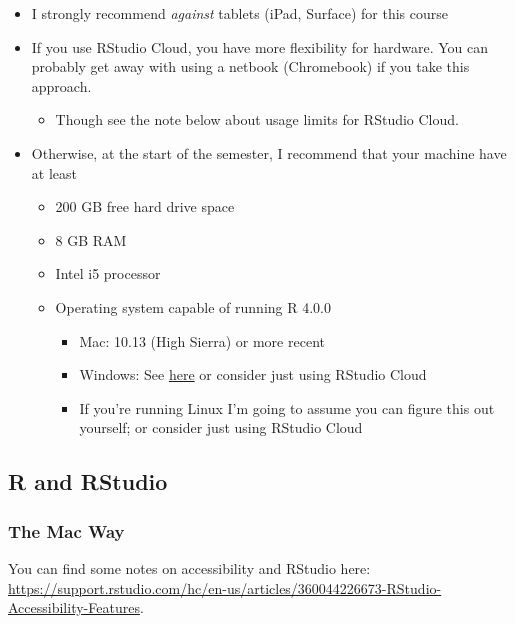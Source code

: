 \documentclass[
]{article}
\providecommand{\tightlist}{%
  \setlength{\itemsep}{0pt}\setlength{\parskip}{0pt}}
\begin{document}
\begin{itemize}
\tightlist
\item
  I strongly recommend \emph{against} tablets (iPad, Surface) for this course
\item
  If you use RStudio Cloud, you have more flexibility for hardware. You can probably get away with using a netbook (Chromebook) if you take this approach.

  \begin{itemize}
  \tightlist
  \item
    Though see the note below about usage limits for RStudio Cloud.
  \end{itemize}
\item
  Otherwise, at the start of the semester, I recommend that your machine have at least

  \begin{itemize}
  \tightlist
  \item
    200 GB free hard drive space
  \item
    8 GB RAM
  \item
    Intel i5 processor
  \item
    Operating system capable of running R 4.0.0

    \begin{itemize}
    \tightlist
    \item
      Mac: 10.13 (High Sierra) or more recent
    \item
      Windows: See \href{https://cran.r-project.org/bin/windows/base/rw-FAQ.html\#Does-R-run-under-Windows-Vista_003f}{here} or consider just using RStudio Cloud
    \item
      If you're running Linux I'm going to assume you can figure this out yourself; or consider just using RStudio Cloud
    \end{itemize}
  \end{itemize}
\end{itemize}

\hypertarget{r-and-rstudio}{%
\subsection{R and RStudio}\label{r-and-rstudio}}

\hypertarget{the-mac-way}{%
\subsubsection{The Mac Way}\label{the-mac-way}}

You can find some notes on accessibility and RStudio here: \url{https://support.rstudio.com/hc/en-us/articles/360044226673-RStudio-Accessibility-Features}.
\end{document}

